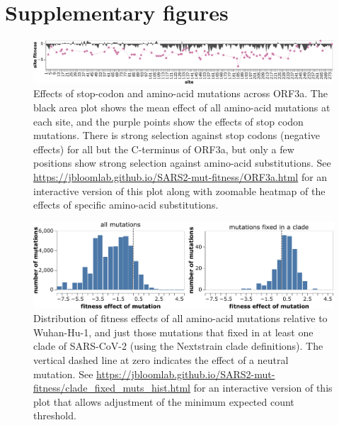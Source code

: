 \documentclass[9pt,twocolumn,twoside]{gsajnl_modified}
\begin{document}
\clearpage

\section{Supplementary figures}

\begin{figure}[h]
\includegraphics[width=\linewidth]{figs/ORF3a.pdf}
\caption{
Effects of stop-codon and amino-acid mutations across ORF3a.
The black area plot shows the mean effect of all amino-acid mutations at each site, and the purple points show the effects of stop codon mutations.
There is strong selection against stop codons (negative effects) for all but the C-terminus of ORF3a, but only a few positions show strong selection against amino-acid substitutions.
See \url{https://jbloomlab.github.io/SARS2-mut-fitness/ORF3a.html} for an interactive version of this plot along with zoomable heatmap of the effects of specific amino-acid substitutions.
\label{fig:ORF3a}
}
\end{figure}

\begin{figure}
\centering
\includegraphics[width=0.7\linewidth]{figs/fixed_dist.pdf}
\caption{
Distribution of fitness effects of all amino-acid mutations relative to Wuhan-Hu-1, and just those mutations that fixed in at least one clade of SARS-CoV-2 (using the Nextstrain clade definitions).
The vertical dashed line at zero indicates the effect of a neutral mutation.
See \url{https://jbloomlab.github.io/SARS2-mut-fitness/clade_fixed_muts_hist.html} for an interactive version of this plot that allows adjustment of the minimum expected count threshold.
\label{fig:fixed_dist}
}
\end{figure}
\end{document}
